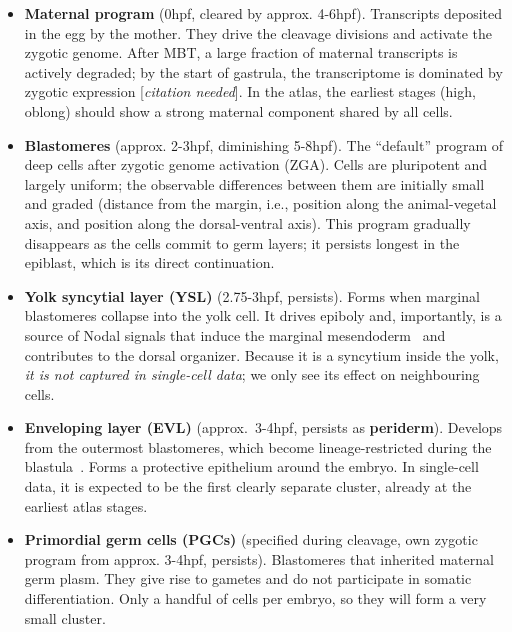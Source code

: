 \documentclass[11pt,a4paper]{article}
\newcommand{\citationneeded}{[\emph{citation needed}]}
\begin{document}
\begin{itemize}
	\item \textbf{Maternal program} (0hpf, cleared by approx. 4-6hpf). Transcripts deposited in the egg by the mother. They drive the cleavage divisions and activate the zygotic genome. After MBT, a large fraction of maternal transcripts is actively degraded; by the start of gastrula, the transcriptome is dominated by zygotic expression \citationneeded. In the atlas, the earliest stages (high, oblong) should show a strong maternal component shared by all cells.
	\item \textbf{Blastomeres} (approx. 2-3hpf, diminishing 5-8hpf). The ``default'' program of deep cells after zygotic genome activation (ZGA). Cells are pluripotent and largely uniform; the observable differences between them are initially small and graded (distance from the margin, i.e., position along the animal-vegetal axis, and position along the dorsal-ventral axis). This program gradually disappears as the cells commit to germ layers; it persists longest in the epiblast, which is its direct continuation.
	\item \textbf{Yolk syncytial layer (YSL)} (2.75-3hpf, persists). Forms when marginal blastomeres collapse into the yolk cell. It drives epiboly and, importantly, is a source of Nodal signals that induce the marginal mesendoderm~\cite{rodaway1999,erter1998} and contributes to the dorsal organizer. Because it is a syncytium inside the yolk, \emph{it is not captured in single-cell data}; we only see its effect on neighbouring cells.
	\item \textbf{Enveloping layer (EVL)} (approx.~3-4hpf, persists as \textbf{periderm}). Develops from the outermost blastomeres, which become lineage-restricted during the blastula~\cite{kimmel1990}. Forms a protective epithelium around the embryo. In single-cell data, it is expected to be the first clearly separate cluster, already at the earliest atlas stages.
	\item \textbf{Primordial germ cells (PGCs)} (specified during cleavage, own zygotic program from approx. 3-4hpf, persists). Blastomeres that inherited maternal germ plasm. They give rise to gametes and do not participate in somatic differentiation. Only a handful of cells per embryo, so they will form a very small cluster.

\end{itemize}
\end{document}
